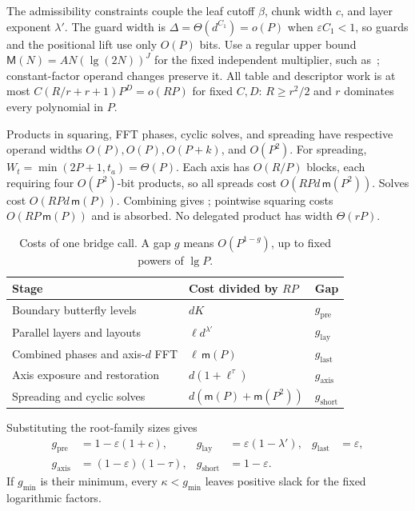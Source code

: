\documentclass[11pt]{article}
\theoremstyle{definition}
\renewcommand{\label}[1]{}%
\newcommand{\eps}{\varepsilon}
\begin{document}
The admissibility constraints couple the leaf cutoff $\beta$, chunk width $c$, and layer exponent $\lambda'$.
The guard width is $\Delta=\Theta(d^{C_1})=o(P)$ when $\eps C_1<1$, so guards and the positional lift use only $O(P)$ bits.
Use a regular upper bound $\mathsf M(N)=A N(\lg(2N))^J$ for the fixed independent multiplier, such as~\cite{SS71}; constant-factor operand changes preserve it.
All table and descriptor work is at most $C(R/r+r+1)P^D=o(RP)$ for fixed $C,D$:
$R\ge r^2/2$ and $r$ dominates every polynomial in $P$.

Products in squaring, FFT phases, cyclic solves, and spreading have respective
operand widths $O(P),O(P),O(P+k)$, and $O(P^2)$.
For spreading, $W_t=\min(2P+1,t_a)=\Theta(P)$.
Each axis has $O(R/P)$ blocks, each requiring four $O(P^2)$-bit products, so all spreads cost $O(RPd\,\mathsf m(P^2))$.
Solves cost $O(RPd\,\mathsf m(P))$.
Combining  gives
; pointwise squaring costs $O(RP\,\mathsf m(P))$ and is absorbed.
No delegated product has width $\Theta(rP)$.

\begin{table}[tb]
\centering\small
\setlength{\tabcolsep}{4pt}
\begin{tabularx}{\linewidth}{@{}>{\raggedright\arraybackslash}Xll@{}}
\toprule
Stage & Cost divided by $RP$ & Gap\\
\midrule
Boundary butterfly levels & $dK$ & $g_{\mathrm{pre}}$\\
Parallel layers and layouts & $\ell d^{\lambda'}$ & $g_{\mathrm{lay}}$\\
Combined phases and axis-$d$ FFT & $\ell\,\mathsf m(P)$ & $g_{\mathrm{last}}$\\
Axis exposure and restoration & $d(1+\ell^\tau)$ & $g_{\mathrm{axis}}$\\
Spreading and cyclic solves & $d(\mathsf m(P)+\mathsf m(P^2))$ & $g_{\mathrm{short}}$\\
\bottomrule
\end{tabularx}
\caption{Costs of one bridge call. A gap $g$ means $O(P^{1-g})$,
up to fixed powers of $\lg P$.}\label{tab:costs}
\end{table}

Substituting the root-family sizes gives
\begin{equation}\label{eq:gaps}
\begin{aligned}
 g_{\mathrm{pre}}&=1-\eps(1+c),&
 g_{\mathrm{lay}}&=\eps(1-\lambda'),&
 g_{\mathrm{last}}&=\eps,\\
 g_{\mathrm{axis}}&=(1-\eps)(1-\tau),&
 g_{\mathrm{short}}&=1-\eps.
\end{aligned}
\end{equation}
If $g_{\min}$ is their minimum, every $\kappa<g_{\min}$ leaves positive slack for the fixed logarithmic factors.
\end{document}
